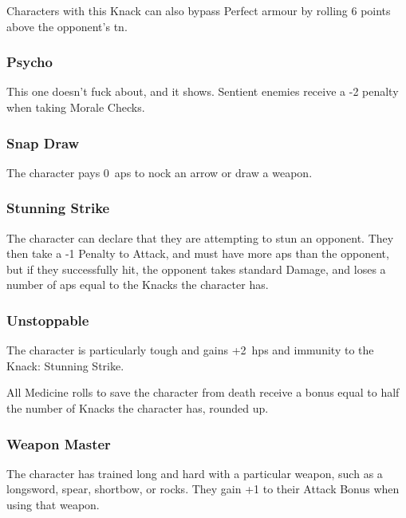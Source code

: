 \begin{multicols}{2}
Characters with this Knack can also bypass Perfect armour by rolling 6 points above the opponent's \gls{tn}.

\subsubsection{Psycho}

This one doesn't fuck about, and it shows.
Sentient enemies receive a -2 penalty when taking Morale Checks.%

\subsubsection{Snap Draw}

The character pays 0~\glspl{ap} to nock an arrow or draw a weapon.

\subsubsection{Stunning Strike}\label{stunningstrike}

The character can declare that they are attempting to stun an opponent.
They then take a -1 Penalty to Attack, and must have more \glspl{ap} than the opponent, but if they successfully hit, the opponent takes standard Damage, and loses a number of \glspl{ap} equal to the Knacks the character has.

\subsubsection{Unstoppable}

The character is particularly tough and gains +2~\glspl{hp} and immunity to the Knack: Stunning Strike.

All Medicine rolls to save the character from death receive a bonus equal to half the number of Knacks the character has, rounded up.

\subsubsection{Weapon Master}

The character has trained long and hard with a particular weapon, such as a longsword, spear, shortbow, or rocks.
They gain +1 to their Attack Bonus when using that weapon.

\end{multicols}


